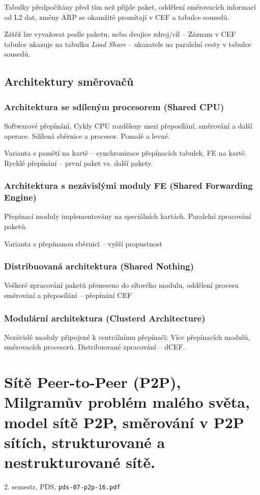 \documentclass[a4paper, 11pt]{report}
\begin{document}
Tabulky předpočítány před tím než přijde paket, oddělení směrovacích informací od L2 dat, změny ARP se okamžitě promítají v CEF a tabulce sousedů.

Zátěž lze vyvažovat podle paketu, nebo dvojice zdroj/cíl -- Záznam v CEF tabulce ukazuje na tabulku \emph{Load Share} -- ukazatele na paralelní cesty v tabulce sousedů.

\section{Architektury směrovačů}
\subsection{Architektura se sdíleným procesorem (Shared CPU)}
Softwarové přepínání, Cykly CPU rozděleny mezi přeposílání, směrování a další operace. Sdílená sběrnice a procesor. Pomalé a levné.

Varianta s pamětí na kartě -- synchronizace přepínacích tabulek, FE na kartě. Rychlé přepínání -- první paket vs. další pakety.

\subsection{Architektura s nezávislými moduly FE (Shared Forwarding Engine)}
Přepínací moduly implementovány na speciálních kartách. Paralelní zpracování paketů.

Varianta s přepínanou sběrnicí -- vyšší propustnost

\subsection{Distribuovaná architektura (Shared Nothing)}
Veškeré zpracování paketů přeneseno do síťového modulu, oddělení procesu směrování a přeposílání  -- přepínání CEF

\subsection{Modulární architektura (Clusterd Architecture)}
Nezávislé moduly připojené k centrálnímu přepínači: Více přepínacích modulů, směrovacích procesorů. Distribuované zpracování -- dCEF.


\chapter{Sítě Peer-to-Peer (P2P), Milgramův problém malého světa, model sítě P2P, směrování v P2P sítích, strukturované a nestrukturované sítě.} \label{cha:41}
2. semestr, PDS, \texttt{pds-07-p2p-16.pdf}
\end{document}
